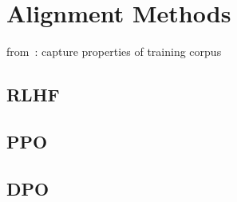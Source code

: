 \section{Alignment Methods}\label{sec:alignment-methods}
from~\autocite{zhao2023survey}:
capture properties of training corpus

\subsection{RLHF}\label{subsec:rlhf}

\subsection{PPO}\label{subsec:ppo}

\subsection{DPO}\label{subsec:dpo}
